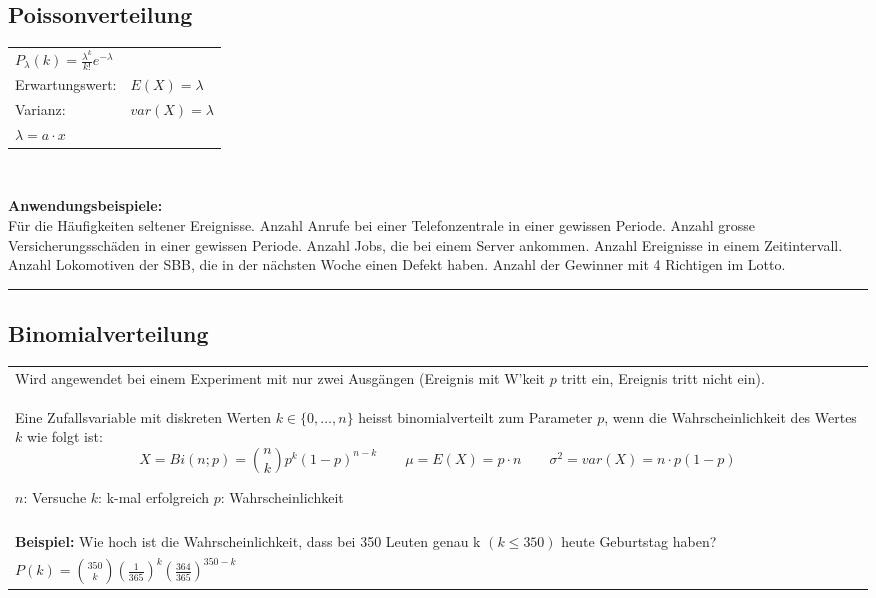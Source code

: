 	\subsection{Poissonverteilung  }
	\begin{multicols}{3}
		\begin{tabular}{ll}
        $P_\lambda(k)=\frac{\lambda^k}{k!}e^{-\lambda}$ & \\
        Erwartungswert:  & $E(X)=\lambda$\\
        Varianz:  & $var(X)=\lambda$ \\
        $\lambda = a \cdot x$ \\
        \end{tabular} \\
        \columnbreak
        
        {\bf Anwendungsbeispiele:} \\ Für die Häufigkeiten seltener
        Ereignisse. Anzahl Anrufe bei einer Telefonzentrale in einer gewissen
        Periode. Anzahl grosse Versicherungsschäden in einer gewissen Periode.
        Anzahl Jobs, die bei einem Server ankommen. Anzahl Ereignisse in
        einem Zeitintervall. Anzahl Lokomotiven der SBB, die in der nächsten Woche 
        einen Defekt haben. Anzahl der Gewinner mit 4 Richtigen im Lotto.
     \end{multicols}
        

\hrule

		\subsection{Binomialverteilung  }
		\begin{tabular}{p{18cm}}
    	Wird angewendet bei einem Experiment mit nur zwei Ausgängen (Ereignis mit W'keit $p$ tritt
    	ein, Ereignis tritt nicht ein). \\
    	Eine Zufallsvariable mit diskreten Werten $k \in \{
    	0,\ldots,n \}$ heisst binomialverteilt zum Parameter $p$, wenn die
        Wahrscheinlichkeit des Wertes $k$ wie folgt ist:
		$$X = Bi(n; p) = \binom n k p^k(1-p)^{n-k} \qquad \mu = E(X) = p \cdot n \qquad \sigma^2 =
		var(X) = n \cdot p (1-p)$$
		
		$n$: Versuche \hspace{10mm}
		$k$: k-mal erfolgreich \hspace{10mm}
		$p$: Wahrscheinlichkeit\\\\
		
		{\bf Beispiel:} Wie hoch ist die Wahrscheinlichkeit, dass bei 350 Leuten genau
		k $(k\leq 350)$ heute Geburtstag haben?\\
		$P(k)=\binom {350} k \left(\frac{1}{365}\right)^k
		\left(\frac{364}{365}\right)^{350-k}$
		
        \end{tabular}


